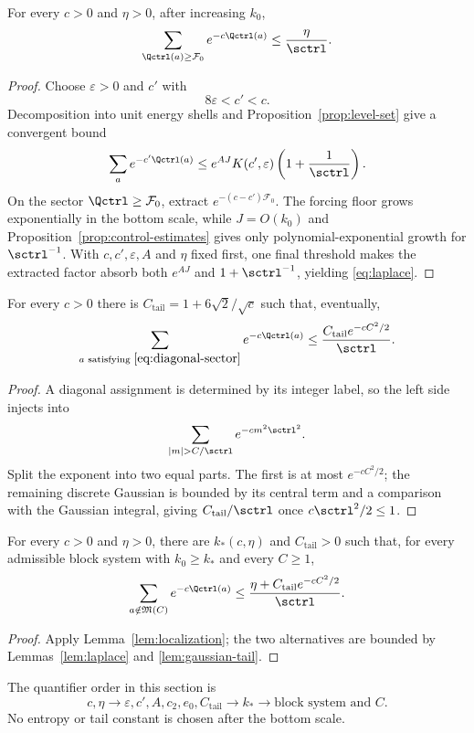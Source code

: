 \begin{lemma}\label{lem:laplace}
For every $c>0$ and $\eta>0$, after increasing $k_0$,
\begin{equation}\label{eq:laplace}
 \sum_{\Qctrl(a)\ge\mathcal F_0}e^{-c\Qctrl(a)}
 \le\frac\eta{\sctrl}.
\end{equation}
\end{lemma}
\begin{proof}
Choose $\varepsilon>0$ and $c'$ with
\[
 8\varepsilon<c'<c.
\]
Decomposition into unit energy shells and Proposition~\ref{prop:level-set}
give a convergent bound
\[
 \sum_a e^{-c'\Qctrl(a)}
 \le e^{AJ}K(c',\varepsilon)
 \left(1+\frac1{\sctrl}\right).
\]
On the sector $\Qctrl\ge\mathcal F_0$, extract
$e^{-(c-c')\mathcal F_0}$.  The forcing floor grows exponentially in the
bottom scale, while $J=O(k_0)$ and Proposition~\ref{prop:control-estimates}
gives only polynomial-exponential growth for $\sctrl^{-1}$.  With
$c,c',\varepsilon,A$ and $\eta$ fixed first, one final threshold makes the
extracted factor absorb both $e^{AJ}$ and $1+\sctrl^{-1}$, yielding
\eqref{eq:laplace}.
\end{proof}

\begin{lemma}\label{lem:gaussian-tail}
For every $c>0$ there is
$C_{\mathrm{tail}}=1+6\sqrt2/\sqrt c$ such that, eventually,
\begin{equation}\label{eq:gaussian-tail}
 \sum_{\substack{a\text{ satisfying }\eqref{eq:diagonal-sector}}}
 e^{-c\Qctrl(a)}
 \le\frac{C_{\mathrm{tail}}e^{-cC^2/2}}{\sctrl}.
\end{equation}
\end{lemma}
\begin{proof}
A diagonal assignment is determined by its integer label, so the left side
injects into
\[
 \sum_{|m|>C/\sctrl}e^{-cm^2\sctrl^2}.
\]
Split the exponent into two equal parts.  The first is at most
$e^{-cC^2/2}$; the remaining discrete Gaussian is bounded by its central term
and a comparison with the Gaussian integral, giving
$C_{\mathrm{tail}}/\sctrl$ once $c\sctrl^2/2\le1$.
\end{proof}

\begin{theorem}\label{thm:global-partition}
For every $c>0$ and $\eta>0$, there are $k_*(c,\eta)$ and
$C_{\mathrm{tail}}>0$ such that, for every admissible block system with
$k_0\ge k_*$ and every $C\ge1$,
\begin{equation}\label{eq:global-partition}
 \sum_{a\notin\mathfrak M(C)}e^{-c\Qctrl(a)}
 \le\frac{\eta+C_{\mathrm{tail}}e^{-cC^2/2}}{\sctrl}.
\end{equation}
\end{theorem}
\begin{proof}
Apply Lemma~\ref{lem:localization}; the two alternatives are bounded by
Lemmas~\ref{lem:laplace} and \ref{lem:gaussian-tail}.
\end{proof}

The quantifier order in this section is
\[
 c,\eta
 \longrightarrow
 \varepsilon,c',A,c_2,e_0,C_{\mathrm{tail}}
 \longrightarrow k_*
 \longrightarrow \text{block system and }C.
\]
No entropy or tail constant is chosen after the bottom scale.

